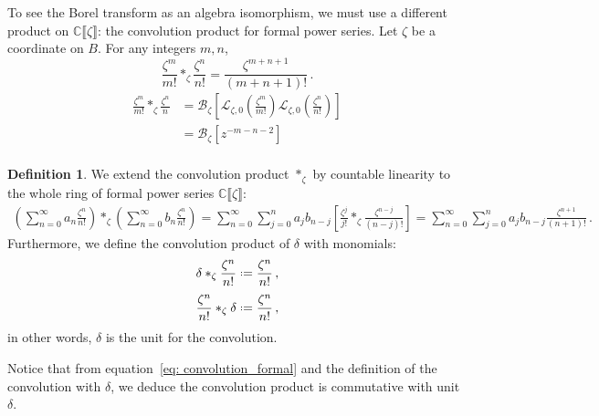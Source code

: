 \documentclass{article}
\newcommand{\C}{\mathbb{C}}
\newcommand{\series}[1]{\tilde{#1}}
\newcommand*{\defeq}{\mathrel{\vcenter{\baselineskip0.5ex \lineskiplimit0pt
                     \hbox{\scriptsize.}\hbox{\scriptsize.}}}%
                     =}
\newcommand{\laplace}{\mathcal{L}}
\newcommand{\borel}{\mathcal{B}}
\theoremstyle{definition}
\newtheorem{definition}{Definition}[section]
\theoremstyle{plain}
\newenvironment{verify}{\color{ForestGreen}}{\color{black}}
\begin{document}
To see the Borel transform as an algebra isomorphism, we must use a different product on $\C\llbracket\zeta\rrbracket$: the convolution product for formal power series. Let $\zeta$ be a coordinate on $B$. For any integers $m, n$,%
\begin{equation}\label{eq: convolution_formal}
\frac{\zeta^m}{m!} \ast_\zeta \frac{\zeta^n}{n!} = \frac{\zeta^{m+n+1}}{(m+n+1)!} \,.
\end{equation}
\begin{verify}
\begin{align*}
\frac{\zeta^m}{m!} \ast_\zeta \frac{\zeta^n}{n} & = \borel_\zeta \left[ \laplace_{\zeta, 0}\left(\frac{\zeta^m}{m!}\right) \laplace_{\zeta, 0} \left(\frac{\zeta^n}{n!}\right) \right] \\
& = \borel_\zeta[z^{-m-n-2}] \\
\end{align*}
\end{verify}
\begin{definition}\label{def:convolution_formal}
We extend the convolution product $\ast_\zeta$ by countable linearity to the whole ring of formal power series $\C\llbracket\zeta\rrbracket$:
\begin{align*}
   \left( \sum_{n=0}^\infty a_n \frac{\zeta^n}{n!}\right)\ast_\zeta\left(\sum_{n=0}^\infty b_n\frac{\zeta^n}{n!}\right)=\sum_{n=0}^\infty\sum_{j=0}^na_jb_{n-j}\left[\frac{\zeta^j}{j!}\ast_\zeta\frac{\zeta^{n-j}}{(n-j)!}\right]=\sum_{n=0}^\infty\sum_{j=0}^na_jb_{n-j}\frac{\zeta^{n+1}}{(n+1)!}\,.
\end{align*}
Furthermore, we define the convolution product of $\delta$ with monomials: \[\delta\ast_\zeta\frac{\zeta^n}{n!}\defeq\frac{\zeta^n}{n!}\,,\]
\[\frac{\zeta^n}{n!}\ast_\zeta\delta\defeq\frac{\zeta^n}{n!}\,,\]
in other words, $\delta$ is the unit for the convolution. 
\end{definition}
Notice that from equation~\eqref{eq: convolution_formal} and the definition of the convolution with $\delta$, we deduce the convolution product is commutative with unit $\delta$.
\end{document}
